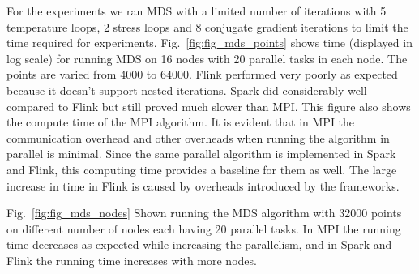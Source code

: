 \documentclass[conference]{IEEEtran}
\begin{document}
For the experiments we ran MDS with a limited number of iterations with 5 temperature loops, 2 stress loops and 8 conjugate gradient iterations to limit the time required for experiments. Fig.~\ref{fig:fig_mds_points} shows time (displayed in log scale) for running MDS on 16 nodes with 20 parallel tasks in each node. The points are varied from 4000 to 64000. Flink performed very poorly as expected because it doesn't support nested iterations. Spark did considerably well compared to Flink but still proved much slower than MPI. This figure also shows the compute time of the MPI algorithm. It is evident that in MPI the communication overhead and other overheads when running the algorithm in parallel is minimal. Since the same parallel algorithm is implemented in Spark and Flink, this computing time provides a baseline for them as well. The large increase in time in Flink is caused by overheads introduced by the frameworks. 

Fig.~\ref{fig:fig_mds_nodes} Shown running the MDS algorithm with 32000 points on different number of nodes each having 20 parallel tasks. In MPI the running time decreases as expected while increasing the parallelism, and in Spark and Flink the running time increases with more nodes.  
\end{document}
